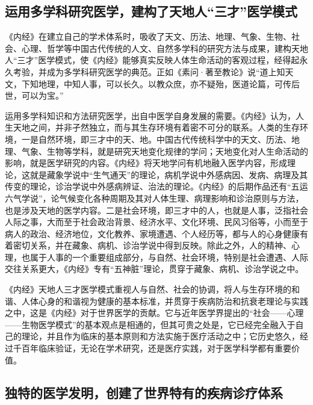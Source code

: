 \documentclass[draft,12pt]{ctexbook}
\begin{document}
\subsection{运用多学科研究医学，建构了天地人“三才”医学模式} %

《内经》在建立自己的学术体系时，吸收了天文、历法、地理、气象、生物、社会、心理、哲学等中国古代传统的人文、自然多学科的研究方法与成果，建构天地人“三才”医学模式，使《内经》能够真实反映人体生命活动的客观过程，经得起永久考验，并成为多学科研究医学的典范。正如《素问·著至教论》说“道上知天文，下知地理，中知人事，可以长久。以教众庶，亦不疑殆，医道论篇，可传后世，可以为宝。”

运用多学科知识和方法研究医学，出自中医学自身发展的需要。《内经》认为，人生天地之间，并非孑然独立，而与其生存环境有着密不可分的联系。人类的生存环境，一是自然环境，即三才中的天、地。中国古代传统科学中的天文、历法、地理、气象、生物等学科，就是研究天地变化规律的学问；天地变化对人生命活动的影响，就是医学研究的内容。《内经》将天地学问有机地融入医学内容，形成理论，这就是藏象学说中“生气通天”的理论，病机学说中外感病因、发病、病理及其传变的理论，诊治学说中外感病辨证、治法的理论。《内经》的后期作品还有“五运六气学说”，论气候变化各种周期及其对人体生理、病理影响和诊治原则与方法，也是涉及天地的医学内容。二是社会环境，即三才中的人，也就是人事，泛指社会人际之事，大而至于社会政治背景、经济水平、文化环境、民风习俗等，小而至于病人的政治、经济地位，文化教养、家境遭遇、个人经历等，都与人的心身健康有着密切关系，并在藏象、病机、诊治学说中得到反映。除此之外，人的精神、心理，也属于人事的一个重要组成部分，与自然、社会环境，特别是社会遭遇、人际交往关系更大，《内经》专有“五神脏”理论，贯穿于藏象、病机、诊治学说之中。

《内经》天地人三才医学模式重视人与自然、社会的协调，将人与生存环境的和谐、人体心身的和谐视为健康的基本标准，并贯穿于疾病防治和抗衰老理论与实践之中，这是《内经》对于世界医学的贡献。它与近年医学界提出的“社会——心理——生物医学模式”的基本观点是相通的，但其可贵之处是，它已经完全融入于自己的理论，并且作为临床的基本原则和方法实施于医疗活动之中；它历史悠久，经过千百年临床验证，无论在学术研究，还是医疗实践，对于医学科学都有重要价值。

\subsection{独特的医学发明，创建了世界特有的疾病诊疗体系} %
\end{document}

